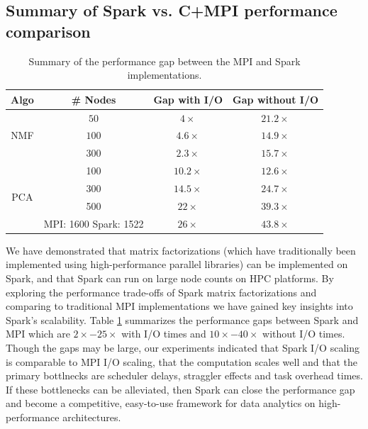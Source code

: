  \subsection{Summary of Spark vs. C+MPI performance comparison}
 \begin{table}[t]
\begin{center}
\begin{tabular}{|c|c|c|c|} \hline
Algo & \# Nodes & Gap with I/O & Gap without I/O\\ \hline
\multirow{3}{*}{NMF} & $50$ & $4\times$ & $21.2 \times$\\
{} & $100$  & $4.6\times$ & $14.9\times$\\
{} & $300$ & $2.3\times$ & $15.7\times$\\ \hline
\multirow{4}{*}{PCA} & 100 & $10.2\times$ & $12.6\times$\\
 {} & 300 & $14.5\times$ & $24.7\times$\\
 {} & 500 & $22\times$ & $39.3\times$\\ \cline{2-4}
 {} & {MPI: 1600 Spark: 1522} & $26\times$ & $43.8\times$\\ \hline
\end{tabular}
\end{center}
\caption{Summary of the performance gap between the MPI and Spark implementations.}
\label{tab:perfgaps}
\end{table}
We have demonstrated that matrix factorizations (which have traditionally been implemented using high-performance parallel libraries) can be implemented on Spark, and that Spark can run on large node counts on HPC platforms. By exploring the performance trade-offs of Spark matrix factorizations and comparing to traditional MPI implementations we have gained key insights into Spark's scalability. Table \ref{tab:perfgaps} summarizes the performance gaps between Spark and MPI which are $2\times - 25\times$ with I/O times and $10\times - 40\times$ without I/O times. Though the gaps may be large, our experiments indicated that Spark I/O scaling is comparable to MPI I/O scaling, that the computation scales well and that the primary bottlnecks are scheduler delays, straggler effects and task overhead times. If these bottlenecks can be alleviated, then Spark can close the performance gap and become a competitive, easy-to-use framework for data analytics on high-performance architectures.   

        
